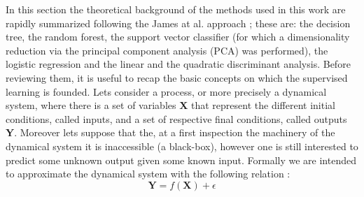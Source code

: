 \documentclass[
12pt, %
a4paper, %
oneside, %
headinclude,footinclude, %
BCOR5mm, %
]{scrartcl}
\begin{document}
In this section the theoretical background of the methods used in this work are rapidly summarized following the James at al. approach \cite{james2013introduction}; these are: the decision tree, the random forest, the support vector classifier (for which a dimensionality reduction via the principal component analysis (PCA) was performed), the logistic regression and the linear and the quadratic discriminant analysis. 
Before reviewing them, it is useful to recap the basic concepts on which the supervised learning is founded. \newline\newline Lets consider a process, or more precisely a dynamical system,  where there is a set of variables \textbf{X} that represent the different initial conditions, called inputs, and a set of respective final conditions, called outputs \textbf{Y}. Moreover lets suppose that the, at a first inspection the machinery of the dynamical system it is inaccessible (a black-box), however one is still interested to predict some unknown output given some known input. Formally we are intended to approximate the dynamical system with the following relation \cite{james2013introduction}: 
\begin{equation}
\textbf{Y}=f(\textbf{X})+\epsilon
\end{equation}
\end{document}
